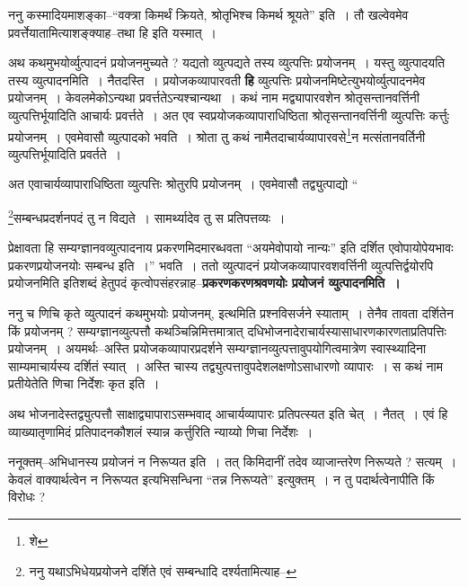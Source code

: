 \documentclass[article,12pt,a4paper]{memoir}
\begin{document}
	  \pstart ननु कस्मादियमाशङ्का--“वक्त्रा किमर्थं क्रियते, श्रोतृभिश्च किमर्थ श्रूयते” इति । तौ खल्वेवमेव प्रवर्त्तेयातामित्याशङ्क्याह--तथा हि इति यस्मात् ।
	\pend
      

	  \pstart अथ कथमुभयोर्व्युत्पादनं प्रयोजनमुच्यते ? यद्यतो व्युत्पद्यते तस्य व्युत्पत्तिः प्रयोजनम् । यस्तु व्युत्पादयति तस्य व्युत्पादनमिति । नैतदस्ति । प्रयोजकव्यापारवती \textbf{हि} व्युत्पत्तिः प्रयोजनमिष्टेत्युभयोर्व्युत्पादनमेव प्रयोजनम् । केवलमेकोऽन्यथा प्रवर्त्ततेऽन्यश्चान्यथा । कथं नाम मद्व्यापारवशेन श्रोतृसन्तानवर्त्तिनी व्युत्पत्तिर्भूयादिति आचार्यः प्रवर्त्तते । अत एव स्वप्रयोजकव्यापाराधिष्ठिता श्रोतृसन्तानवर्त्तिनी व्युत्पत्तिः कर्त्तुः प्रयोजनम् । एवमेवासौ व्युत्पादको भवति । श्रोता तु कथं नामैतदाचार्यव्यापारवसे\footnote{शे}\-न मत्संतानवर्तिनी व्युत्पत्तिर्भूयादिति प्रवर्तते ।
	\pend
      

	  \pstart अत एवाचार्यव्यापाराधिष्ठिता व्युत्पत्तिः श्रोतुरपि प्रयोजनम् । एवमेवासौ तद्व्युत्पाद्यो  \leavevmode{} “
	  
	\footnote{ननु यथाऽभिधेयप्रयोजने दर्शिते एवं सम्बन्धादि दर्श्यतामित्याह--\cite{dp-msD-n}}\-सम्बन्धप्रदर्शनपदं तु न विद्यते । सामर्थ्यादेव तु स प्रतिपत्तव्यः । 
	  
	प्रेक्षावता हि सम्यग्ज्ञानवव्युत्पादनाय प्रकरणमिदमारब्धवता “अयमेवोपायो नान्यः” इति दर्शित एवोपायोपेयभावः प्रकरणप्रयोजनयोः सम्बन्ध इति ।” भवति । ततो व्युत्पादनं प्रयोजकव्यापारवशवर्त्तिनी व्युत्पत्तिर्द्वयोरपि प्रयोजनमिति इतिशब्दं हेतुपदं कृत्वोपसंहरन्नाह--\textbf{प्रकरणकरणश्रवणयोः प्रयोजनं व्युत्पादनमिति ।}
	\pend
      

	  \pstart ननु च णिचि कृते व्युत्पादनं कथमुभयोः प्रयोजनम्, इत्थमिति \leavevmode{} प्रश्नविसर्जने स्याताम् । तेनैव तावता दर्शितेन किं प्रयोजनम् ? सम्यग्ज्ञानव्युत्पत्तौ कथञ्चिन्निमित्तमात्रात् दधिभोजनादेराचार्यस्यासाधारणकारणताप्रतिपत्तिः प्रयोजनम् । अयमर्थः--अस्ति प्रयोजकव्यापारप्रदर्शने सम्यग्ज्ञानव्युत्पत्तावुपयोगित्वमात्रेण स्वास्थ्यादिना साम्यमाचार्यस्य दर्शितं स्यात् । अस्ति चास्य तद्व्युत्पत्तावुपदेशलक्षणोऽसाधारणो व्यापारः । स कथं नाम प्रतीयेतेति णिचा निर्देशः कृत इति ।
	\pend
      

	  \pstart अथ भोजनादेस्तद्व्युत्पत्तौ साक्षाद्व्यापाराऽसम्भवाद् आचार्यव्यापारः प्रतिपत्स्यत इति चेत् । नैतत् । एवं हि व्याख्यातृणामिदं प्रतिपादनकौशलं स्यान्न कर्त्तुरिति न्याय्यो णिचा निर्देशः ।
	\pend
      

	  \pstart ननूक्तम्--अभिधानस्य प्रयोजनं न निरूप्यत इति । तत् किमिदानीं तदेव व्याजान्तरेण निरूप्यते ? सत्यम् । केवलं वाक्यार्थत्वेन न निरूप्यत इत्यभिसन्धिना “तन्न निरूप्यते” इत्युक्तम् । न तु पदार्थत्वेनापीति किं विरोधः ?
	\pend
      
\end{document}
